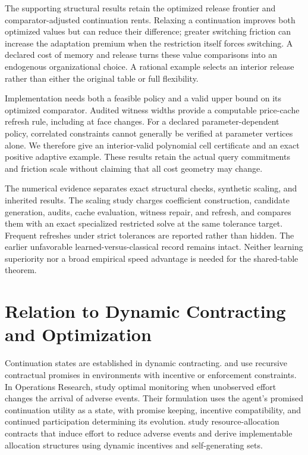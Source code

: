 \documentclass[11pt,letterpaper]{article}
\theoremstyle{definition}\newtheorem{assumption}[theorem]{Assumption}
\begin{document}
The supporting structural results retain the optimized release frontier and comparator-adjusted continuation rents. Relaxing a continuation improves both optimized values but can reduce their difference; greater switching friction can increase the adaptation premium when the restriction itself forces switching. A declared cost of memory and release turns these value comparisons into an endogenous organizational choice. A rational example selects an interior release rather than either the original table or full flexibility.

Implementation needs both a feasible policy and a valid upper bound on its optimized comparator. Audited witness widths provide a computable price-cache refresh rule, including at face changes. For a declared parameter-dependent policy, correlated constraints cannot generally be verified at parameter vertices alone. We therefore give an interior-valid polynomial cell certificate and an exact positive adaptive example. These results retain the actual query commitments and friction scale without claiming that all cost geometry may change.

The numerical evidence separates exact structural checks, synthetic scaling, and inherited results. The scaling study charges coefficient construction, candidate generation, audits, cache evaluation, witness repair, and refresh, and compares them with an exact specialized restricted solve at the same tolerance target. Frequent refreshes under strict tolerances are reported rather than hidden. The earlier unfavorable learned-versus-classical record remains intact. Neither learning superiority nor a broad empirical speed advantage is needed for the shared-table theorem.

\section{Relation to Dynamic Contracting and Optimization}\label{sec:literature}
Continuation states are established in dynamic contracting. \citet{SpearSrivastava1987} and \citet{ThomasWorrall1988} use recursive contractual promises in environments with incentive or enforcement constraints. In Operations Research, \citet{ChenSunXiao2020} study optimal monitoring when unobserved effort changes the arrival of adverse events. Their formulation uses the agent's promised continuation utility as a state, with promise keeping, incentive compatibility, and continued participation determining its evolution. \citet{LiangSunTangZhang2023} study resource-allocation contracts that induce effort to reduce adverse events and derive implementable allocation structures using dynamic incentives and self-generating sets.
\end{document}

